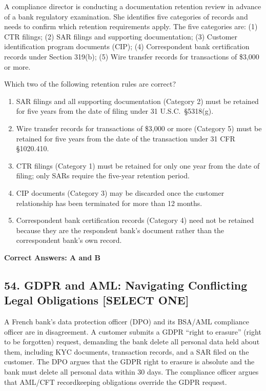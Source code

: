 \documentclass[11pt,a4paper]{article}
\begin{document}
	A compliance director is conducting a documentation retention review in advance of a bank regulatory examination. She identifies five categories of records and needs to confirm which retention requirements apply. The five categories are: (1) CTR filings; (2) SAR filings and supporting documentation; (3) Customer identification program documents (CIP); (4) Correspondent bank certification records under Section 319(b); (5) Wire transfer records for transactions of \$3,000 or more.
	
	Which two of the following retention rules are correct?
	
	\begin{enumerate}[label=\Alph*.]
		\item SAR filings and all supporting documentation (Category 2) must be retained for five years from the date of filing under 31 U.S.C.\ \S 5318(g).
		\item Wire transfer records for transactions of \$3,000 or more (Category 5) must be retained for five years from the date of the transaction under 31 CFR \S 1020.410.
		\item CTR filings (Category 1) must be retained for only one year from the date of filing; only SARs require the five-year retention period.
		\item CIP documents (Category 3) may be discarded once the customer relationship has been terminated for more than 12 months.
		\item Correspondent bank certification records (Category 4) need not be retained because they are the respondent bank's document rather than the correspondent bank's own record.
	\end{enumerate}
	\textbf{Correct Answers: A and B}
	
	\subsection{54. GDPR and AML: Navigating Conflicting Legal Obligations \textnormal{[SELECT ONE]}}
	
	A French bank's data protection officer (DPO) and its BSA/AML compliance officer are in disagreement. A customer submits a GDPR ``right to erasure'' (right to be forgotten) request, demanding the bank delete all personal data held about them, including KYC documents, transaction records, and a SAR filed on the customer. The DPO argues that the GDPR right to erasure is absolute and the bank must delete all personal data within 30 days. The compliance officer argues that AML/CFT recordkeeping obligations override the GDPR request.
	
\end{document}
